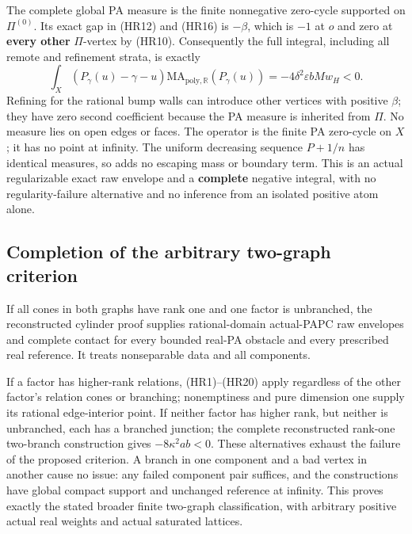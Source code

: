 \documentclass[
  11pt,
]{article}
\begin{document}
The complete global PA measure is the finite nonnegative zero-cycle
supported on \(\Pi^{(0)}\). Its exact gap in (HR12) and (HR16) is
\(-\beta\), which is \(-1\) at \(o\) and zero at \textbf{every other}
\(\Pi\)-vertex by (HR10). Consequently the full integral, including all
remote and refinement strata, is exactly \[
 \int_X(P_\gamma(u)-\gamma-u)
              \mathrm{MA}_{\mathrm{poly},\mathbb{R}}(P_\gamma(u))
                  =-4\delta^2\varepsilon bMw_H<0.           \tag{HR20}
\] Refining for the rational bump walls can introduce other vertices
with positive \(\beta\); they have zero second coefficient because the
PA measure is inherited from \(\Pi\). No measure lies on open edges or
faces. The operator is the finite PA zero-cycle on \(X\); it has no
point at infinity. The uniform decreasing sequence \(P+1/n\) has
identical measures, so adds no escaping mass or boundary term. This is
an actual regularizable exact raw envelope and a \textbf{complete}
negative integral, with no regularity-failure alternative and no
inference from an isolated positive atom alone.

\subsection{Completion of the arbitrary two-graph
criterion}\label{completion-of-the-arbitrary-two-graph-criterion}

If all cones in both graphs have rank one and one factor is unbranched,
the reconstructed cylinder proof supplies rational-domain actual-PAPC
raw envelopes and complete contact for every bounded real-PA obstacle
and every prescribed real reference. It treats nonseparable data and all
components.

If a factor has higher-rank relations, (HR1)--(HR20) apply regardless of
the other factor's relation cones or branching; nonemptiness and pure
dimension one supply its rational edge-interior point. If neither factor
has higher rank, but neither is unbranched, each has a branched
junction; the complete reconstructed rank-one two-branch construction
gives \(-8\kappa^2ab<0\). These alternatives exhaust the failure of the
proposed criterion. A branch in one component and a bad vertex in
another cause no issue: any failed component pair suffices, and the
constructions have global compact support and unchanged reference at
infinity. This proves exactly the stated broader finite two-graph
classification, with arbitrary positive actual real weights and actual
saturated lattices.
\end{document}

